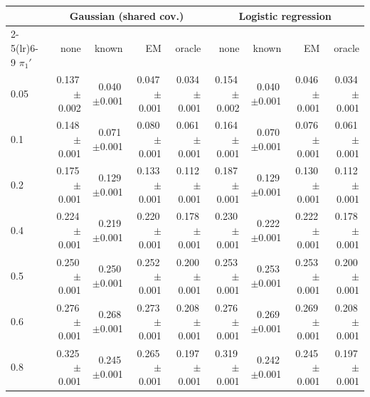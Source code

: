 \begin{tabular}{lrrrrrrrr}
\toprule
 & \multicolumn{4}{c}{Gaussian (shared cov.)} & \multicolumn{4}{c}{Logistic regression} \\
\cmidrule(lr){2-5}\cmidrule(lr){6-9}
$\pi_1'$ & none & known & EM & oracle & none & known & EM & oracle \\
\midrule
0.05 & 0.137\,{\scriptsize$\pm$0.002} & 0.040\,{\scriptsize$\pm$0.001} & 0.047\,{\scriptsize$\pm$0.001} & 0.034\,{\scriptsize$\pm$0.001} & 0.154\,{\scriptsize$\pm$0.002} & 0.040\,{\scriptsize$\pm$0.001} & 0.046\,{\scriptsize$\pm$0.001} & 0.034\,{\scriptsize$\pm$0.001} \\
0.1 & 0.148\,{\scriptsize$\pm$0.001} & 0.071\,{\scriptsize$\pm$0.001} & 0.080\,{\scriptsize$\pm$0.001} & 0.061\,{\scriptsize$\pm$0.001} & 0.164\,{\scriptsize$\pm$0.001} & 0.070\,{\scriptsize$\pm$0.001} & 0.076\,{\scriptsize$\pm$0.001} & 0.061\,{\scriptsize$\pm$0.001} \\
0.2 & 0.175\,{\scriptsize$\pm$0.001} & 0.129\,{\scriptsize$\pm$0.001} & 0.133\,{\scriptsize$\pm$0.001} & 0.112\,{\scriptsize$\pm$0.001} & 0.187\,{\scriptsize$\pm$0.001} & 0.129\,{\scriptsize$\pm$0.001} & 0.130\,{\scriptsize$\pm$0.001} & 0.112\,{\scriptsize$\pm$0.001} \\
0.4 & 0.224\,{\scriptsize$\pm$0.001} & 0.219\,{\scriptsize$\pm$0.001} & 0.220\,{\scriptsize$\pm$0.001} & 0.178\,{\scriptsize$\pm$0.001} & 0.230\,{\scriptsize$\pm$0.001} & 0.222\,{\scriptsize$\pm$0.001} & 0.222\,{\scriptsize$\pm$0.001} & 0.178\,{\scriptsize$\pm$0.001} \\
0.5 & 0.250\,{\scriptsize$\pm$0.001} & 0.250\,{\scriptsize$\pm$0.001} & 0.252\,{\scriptsize$\pm$0.001} & 0.200\,{\scriptsize$\pm$0.001} & 0.253\,{\scriptsize$\pm$0.001} & 0.253\,{\scriptsize$\pm$0.001} & 0.253\,{\scriptsize$\pm$0.001} & 0.200\,{\scriptsize$\pm$0.001} \\
0.6 & 0.276\,{\scriptsize$\pm$0.001} & 0.268\,{\scriptsize$\pm$0.001} & 0.273\,{\scriptsize$\pm$0.001} & 0.208\,{\scriptsize$\pm$0.001} & 0.276\,{\scriptsize$\pm$0.001} & 0.269\,{\scriptsize$\pm$0.001} & 0.269\,{\scriptsize$\pm$0.001} & 0.208\,{\scriptsize$\pm$0.001} \\
0.8 & 0.325\,{\scriptsize$\pm$0.001} & 0.245\,{\scriptsize$\pm$0.001} & 0.265\,{\scriptsize$\pm$0.001} & 0.197\,{\scriptsize$\pm$0.001} & 0.319\,{\scriptsize$\pm$0.001} & 0.242\,{\scriptsize$\pm$0.001} & 0.245\,{\scriptsize$\pm$0.001} & 0.197\,{\scriptsize$\pm$0.001} \\
\bottomrule
\end{tabular}
